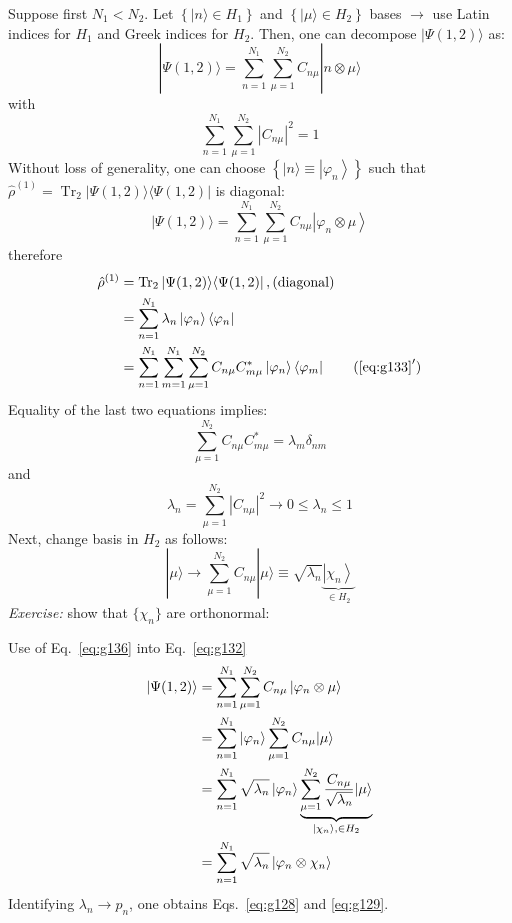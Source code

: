 \documentclass[12pt]{article}
\newcommand{\be}{\begin{equation}}
\newcommand{\ee}{\end{equation}}
\begin{document}
Suppose first $N_{1} < N_{2}$. Let 
\(\left\{|n\rangle   \in H_{1}\right\}\) and
\(\left\{|\mu\rangle \in H_{2}\right\}\) bases $\to$ 
use Latin indices for $H_1$
and Greek indices for $H_2$.
Then, one can decompose \(|\Psi(1,2)\rangle\) as:
\be
|\Psi(1,2)\rangle=\sum_{n=1}^{N_{1}} \sum_{\mu=1}^{N_{2}} C_{n \mu} | n\otimes \mu\rangle
\label{eq:g130}
\ee
with
\be
\sum_{n=1}^{N_{1}} \sum_{\mu=1}^{N_{2}}\left|C_{n\mu}\right|^{2}=1
\ee
Without loss of generality, one can choose \(\left\{|n\rangle \equiv\left|\varphi_{n}\right\rangle\right\}\)
such that \(\hat{\rho}^{(1)}=\operatorname{Tr}_{2}|\Psi(1,2)\rangle\langle\Psi(1,2)|\) is diagonal:
\be
|\Psi(1,2)\rangle=\sum_{n=1}^{N_{1}} \sum_{\mu=1}^{N_{2}} C_{n \mu}\left|\varphi_{n} \otimes \mu\right\rangle
\label{eq:g132}
\ee
therefore
\begin{align} 
\hat{\rho}^{(1)} 
&=\operatorname{Tr}_{2}|\Psi(1,2)\rangle\langle\Psi(1,2)|\,,
\text{(diagonal)}\nonumber\\ 
&=\sum_{n=1}^{N_{1}} \lambda_{n}\left|\varphi_{n}\right\rangle\left\langle\varphi_{n}\right|%
\label{eq:g133}
\\ 
&=\sum_{n=1}^{N_{1}} \sum_{m=1}^{N_{1}} \sum_{\mu=1}^{N_{2}} C_{n \mu} C_{m \mu}^{*}\left|\varphi_{n}\right\rangle\left\langle\varphi_{m}\right|\tag{$\ref{eq:g133}^\prime$}
\end{align}
Equality of the last two equations implies:
\be
\sum_{\mu=1}^{N_{2}} C_{n\mu} C_{m\mu}^{*} =\lambda_{m} \delta_{nm}
\ee
and
\be
\lambda_{n}=\sum_{\mu=1}^{N_{2}}\left|C_{n \mu}\right|^{2} \rightarrow 0 \leqslant \lambda_{n} \leqslant 1
\ee
Next, change basis in $H_2$ as follows:
\be
|\mu\rangle \rightarrow \sum_{\mu=1}^{N_{2}} C_{n \mu}|\mu\rangle \equiv \sqrt{\lambda_{n}}
\underbrace{\left|\chi_{n}\right\rangle}%
_{\in H_2}
\label{eq:g136}
\ee
\emph{Exercise:} show that $\{\chi_n\}$ are orthonormal:

Use of Eq.~\eqref{eq:g136} into Eq.~\eqref{eq:g132}
\be
\begin{aligned}
|\Psi(1,2)\rangle 
&=\sum_{n=1}^{N_{1}} \sum_{\mu=1}^{N_{2}} C_{n \mu}\left|\varphi_{n} \otimes \mu\right\rangle \\
&=\sum_{n=1}^{N_{1}}\left|\varphi_{n}\right\rangle \sum_{\mu=1}^{N_{2}} C_{n \mu}|\mu\rangle \\
&=\sum_{n=1}^{N_{1}} \sqrt{\lambda_{n}}\left|\varphi_{n}\right\rangle 
\underbrace{\sum_{\mu=1}^{N_{2}} \frac{C_{n\mu}}{\sqrt{\lambda_{n}}}|\mu\rangle}%
_{\ket{\chi_n},\in H_2}\\
&=\sum_{n=1}^{N_{1}} \sqrt{\lambda_{n}}\left|\varphi_{n}\otimes \chi_{n}\right\rangle 
\end{aligned}
\label{eq:g137}
\ee
Identifying $\lambda_n \to p_n$, one obtains Eqs.~\eqref{eq:g128} and \eqref{eq:g129}.
\end{document}
